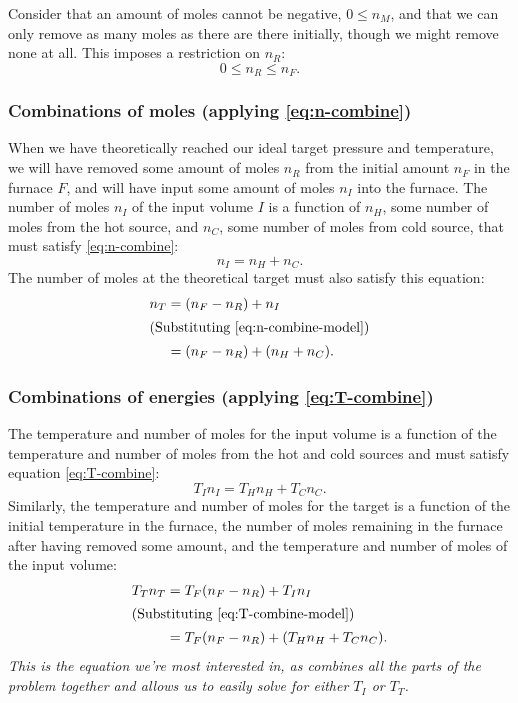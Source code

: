 \documentclass{article}
\begin{document}
Consider that an amount of moles cannot be negative, $0\le n_M$, and that we can only remove as many
moles as there are there initially, though we might remove none at all. This imposes a restriction
on $n_R$:
\[
    0 \le n_R \le n_F.
\]

\subsubsection*{Combinations of moles (applying \autoref{eq:n-combine})}

When we have theoretically reached our ideal target pressure and temperature, we will have removed
some amount of moles $n_R$ from the initial amount $n_F$ in the furnace $F$, and will have input
some amount of moles $n_I$ into the furnace. The number of moles $n_I$ of the input volume $I$ is a
function of $n_H$, some number of moles from the hot source, and $n_C$, some number of moles from
cold source, that must satisfy \autoref{eq:n-combine}:
\begin{equation}
    n_I = n_H + n_C.
    \label{eq:n-combine-model}
\end{equation}
The number of moles at the theoretical target must also satisfy this equation:
\begin{align*}
    n_T
    &= (n_F-n_R)+n_I \\
    \intertext{(Substituting \autoref{eq:n-combine-model})}
    &= (n_F-n_R)+(n_H + n_C).
\end{align*}

\subsubsection*{Combinations of energies (applying \autoref{eq:T-combine})}

The temperature and number of moles for the input volume is a function of the temperature and number
of moles from the hot and cold sources and must satisfy equation
\autoref{eq:T-combine}:
\begin{equation}
    T_I n_I = T_H n_H + T_C n_C.
    \label{eq:T-combine-model}
\end{equation}
Similarly, the temperature and number of moles for the target is a function of the initial
temperature in the furnace, the number of moles remaining in the furnace after having removed some
amount, and the temperature and number of moles of the input volume:
\begin{align}
    T_T n_T
    &= T_F(n_F-n_R)+T_I n_I \label{eq:T-combine-model-2} \\
    \intertext{(Substituting \autoref{eq:T-combine-model})}
    &= T_F(n_F-n_R)+(T_H n_H+T_C n_C). \label{eq:T-combine-model-3}
\end{align}
\emph{This is the equation we're most interested in, as combines all the parts of the problem
together and allows us to easily solve for either $T_I$ or $T_T$.}
\end{document}
